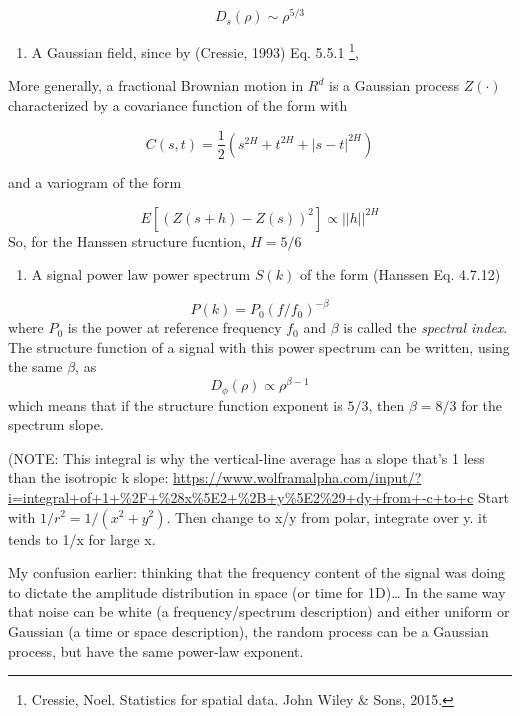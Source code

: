 \documentclass{utexasthesis}
\begin{document}
\[D_s(\rho) \sim \rho^{5/3}\]

\begin{enumerate}

\item
  A Gaussian field, since by (Cressie, 1993) Eq. 5.5.1 \footnote{Cressie,
    Noel. Statistics for spatial data. John Wiley \& Sons, 2015.},
\end{enumerate}

More generally, a fractional Brownian motion in \(R^d\) is a Gaussian
process \(Z(\cdot)\) characterized by a covariance function of the form
with

\[C(s, t) = \frac{1}{2}\left(s^{2H} + t^{2H} + |s-t|^{2H}\right)\]

and a variogram of the form

\[E[(Z(s + h) - Z(s))^2] \propto ||h||^{2H}\] So, for the Hanssen
structure fucntion, \(H=5/6\)

\begin{enumerate}
\def\labelenumi{\arabic{enumi}.}
\setcounter{enumi}{2}

\item
  A signal power law power spectrum \(S(k)\) of the form (Hanssen Eq.
  4.7.12)
\end{enumerate}

\[P(k) = P_0 \left(f/f_0\right)^{-\beta}\] where \(P_0\) is the power at
reference frequency \(f_0\) and \(\beta\) is called the \emph{spectral
index}. The structure function of a signal with this power spectrum can
be written, using the same \(\beta\), as
\[D_{\phi}(\rho) \propto \rho^{\beta-1}\] which means that if the
structure function exponent is \(5/3\), then \(\beta=8/3\) for the
spectrum slope.


(NOTE: This integral is why the vertical-line average has a slope that's 1 less than the isotropic k slope: \url{https://www.wolframalpha.com/input/?i=integral+of+1+%2F+%28x%5E2+%2B+y%5E2%29+dy+from+-c+to+c}
Start with $1 / r^2 = 1/(x^2 + y^2)$.
Then change to x/y from polar, integrate over y. it tends to 1/x for large x.

My confusion earlier: thinking that the frequency content of the signal
was doing to dictate the amplitude distribution in space (or time for
1D)\ldots{} In the same way that noise can be white (a
frequency/spectrum description) and either uniform or Gaussian (a time
or space description), the random process can be a Gaussian process, but
have the same power-law exponent.
\end{document}
